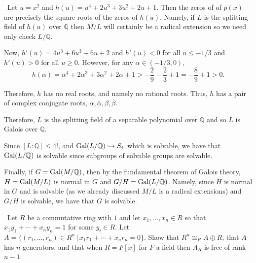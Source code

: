 \documentclass[12pt]{Qual}
\begin{document}
\begin{solution}$\,$
Let $u=x^2$ and $h(u)=u^4+2u^3+3u^2+2u+1$. Then the zeros of of $p(x)$ are precisely the square roots of the zeros of $h(u)$. Namely, if $L$ is the splitting field of $h(u)$ over $\mathbb{Q}$ then $M/L$ will certainly be a radical extension so we need only check $L/\mathbb{Q}.$

Now, $h'(u)=4u^3+6u^3+6u+2$ and $h'(u)<0$ for all $u\le -1/3$ and $h'(u)>0$ for all $u\ge0$. However, for any $\alpha\in(-1/3,0)$, $$h(\alpha)=\alpha^4+2\alpha^3+3\alpha^2+2\alpha+1>-\frac{2}{9}-\frac{2}{3}+1=-\frac{8}{9}+1>0.$$

Therefore, $h$ has no real roots, and namely no rational roots. Thus, $h$ has a pair of complex conjugate roots, $\alpha,\overline{\alpha},\beta,\overline{\beta}$.

Therefore, $L$ is the splitting field of a separable polynomial over $\mathbb{Q}$ and so $L$ is Galois over $\mathbb{Q}$.

Since $[L:\mathbb{Q}]\le 4!$, and $\text{Gal}(L/\mathbb{Q})\hookrightarrow S_4$ which is solvable, we have that $\text{Gal}(L/\mathbb{Q})$ is solvable since subgroups of solvable groups are solvable.

Finally, if $G=\text{Gal}(M/\mathbb{Q})$, then by the fundamental theorem of Galois theory, $H=\text{Gal}(M/L)$ is normal in $G$ and $G/H=\text{Gal}(L/\mathbb{Q})$. Namely, since $H$ is normal in $G$ and is solvable (as we already discussed $M/L$ is a radical extensions) and $G/H$ is solvable, we have that $G$ is solvable.
\end{solution}
\newpage




\begin{problem} $\,$
Let $R$ be a commutative ring with $1$ and let $x_1,...,x_n\in R$ so that $x_1y_1+\cdots+x_ny_n=1$ for some $y_i\in R.$ Let $A=\{(r_1,...,r_n)\in R^n\,|\,x_1r_1+\cdots+x_nr_n=0\}.$ Show that $R^n\cong_RA\oplus R$, that $A$ has $n$ generators, and that when $R=F[x]$ for $F$ a field then $A_R$ is free of rank $n-1$.
\end{problem}
\end{document}
